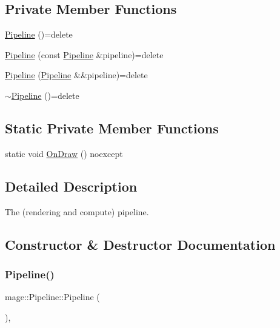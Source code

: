 \subsection*{Private Member Functions}
\begin{DoxyCompactItemize}
\item 
\hyperlink{structmage_1_1_pipeline_a14b6552d547410cf7b8e3f9c1e517caf}{Pipeline} ()=delete
\item 
\hyperlink{structmage_1_1_pipeline_a01ec0c56869dd8a3d5d141c5382493f8}{Pipeline} (const \hyperlink{structmage_1_1_pipeline}{Pipeline} \&pipeline)=delete
\item 
\hyperlink{structmage_1_1_pipeline_ac37ab03d136b44aa03398e09f6cd001f}{Pipeline} (\hyperlink{structmage_1_1_pipeline}{Pipeline} \&\&pipeline)=delete
\item 
\hyperlink{structmage_1_1_pipeline_ae20f17e33397bf96ecd6a85d22fa42a0}{$\sim$\+Pipeline} ()=delete
\end{DoxyCompactItemize}
\subsection*{Static Private Member Functions}
\begin{DoxyCompactItemize}
\item 
static void \hyperlink{structmage_1_1_pipeline_a8d88f7c1e6e436c55fc7947334efaa9e}{On\+Draw} () noexcept
\end{DoxyCompactItemize}


\subsection{Detailed Description}
The (rendering and compute) pipeline. 

\subsection{Constructor \& Destructor Documentation}
\hypertarget{structmage_1_1_pipeline_a14b6552d547410cf7b8e3f9c1e517caf}{}\label{structmage_1_1_pipeline_a14b6552d547410cf7b8e3f9c1e517caf} 
\subsubsection{\texorpdfstring{Pipeline()}{Pipeline()}\hspace{0.1cm}{\footnotesize\ttfamily [1/3]}}
{\footnotesize\ttfamily mage\+::\+Pipeline\+::\+Pipeline (\begin{DoxyParamCaption}{ }\end{DoxyParamCaption})\hspace{0.3cm}{\ttfamily [private]}, {\ttfamily [delete]}}

